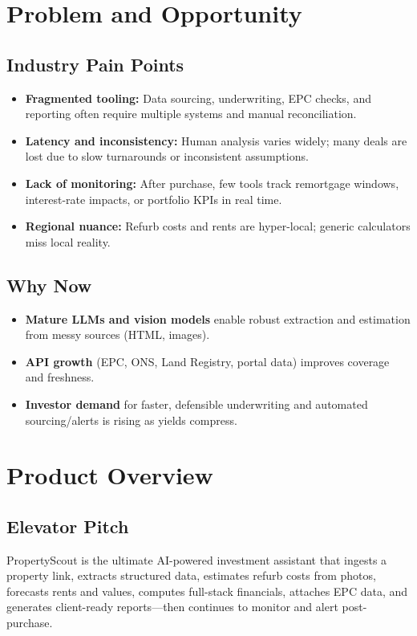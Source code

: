 \documentclass[12pt,a4paper]{article}
\begin{document}
\section{Problem and Opportunity}
\subsection{Industry Pain Points}
\begin{itemize}[leftmargin=1.5em]
  \item \textbf{Fragmented tooling:} Data sourcing, underwriting, EPC checks, and reporting often require multiple systems and manual reconciliation.
  \item \textbf{Latency and inconsistency:} Human analysis varies widely; many deals are lost due to slow turnarounds or inconsistent assumptions.
  \item \textbf{Lack of monitoring:} After purchase, few tools track remortgage windows, interest-rate impacts, or portfolio KPIs in real time.
  \item \textbf{Regional nuance:} Refurb costs and rents are hyper-local; generic calculators miss local reality.
\end{itemize}

\subsection{Why Now}
\begin{itemize}[leftmargin=1.5em]
  \item \textbf{Mature LLMs and vision models} enable robust extraction and estimation from messy sources (HTML, images).
  \item \textbf{API growth} (EPC, ONS, Land Registry, portal data) improves coverage and freshness.
  \item \textbf{Investor demand} for faster, defensible underwriting and automated sourcing/alerts is rising as yields compress.
\end{itemize}

\section{Product Overview}
\subsection{Elevator Pitch}
PropertyScout is the ultimate AI-powered investment assistant that ingests a property link, extracts structured data, estimates refurb costs from photos, forecasts rents and values, computes full-stack financials, attaches EPC data, and generates client-ready reports—then continues to monitor and alert post-purchase.
\end{document}
